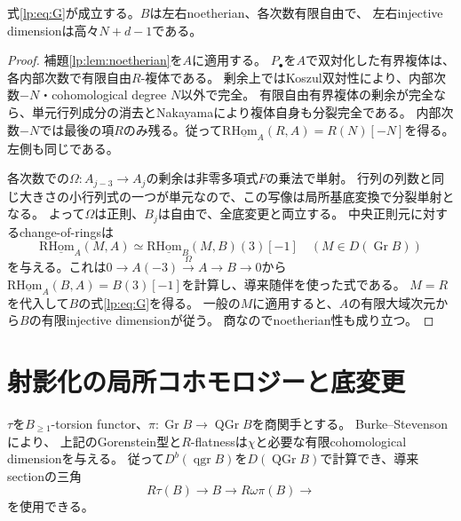 \begin{proposition}[相対Gorenstein型と中心商]\label{lp:prop:gorenstein}
式\eqref{lp:eq:G}が成立する。$B$は左右noetherian、各次数有限自由で、
左右injective dimensionは高々$N+d-1$である。
\end{proposition}
\begin{proof}
補題\ref{lp:lem:noetherian}を$A$に適用する。
$P_\bullet$を$A$で双対化した有界複体は、各内部次数で有限自由$R$-複体である。
剰余上ではKoszul双対性により、内部次数$-N$・cohomological degree $N$以外で完全。
有限自由有界複体の剰余が完全なら、単元行列成分の消去とNakayamaにより複体自身も分裂完全である。
内部次数$-N$では最後の項$R$のみ残る。従って$\operatorname{R\underline{Hom}}_A(R,A)=R(N)[-N]$を得る。
左側も同じである。

各次数での$\Omega:A_{j-3}\to A_j$の剰余は非零多項式$F$の乗法で単射。
行列の列数と同じ大きさの小行列式の一つが単元なので、この写像は局所基底変換で分裂単射となる。
よって$\Omega$は正則、$B_j$は自由で、全底変更と両立する。
中央正則元に対するchange-of-ringsは
\[
 \operatorname{R\underline{Hom}}_A(M,A)
 \simeq\operatorname{R\underline{Hom}}_B(M,B)(3)[-1]
 \quad(M\in D(\operatorname{Gr}B))
 \tag{CR}\label{lp:eq:change-rings}
\]
を与える。これは$0\to A(-3)\xrightarrow{\Omega}A\to B\to0$から
$\operatorname{R\underline{Hom}}_A(B,A)=B(3)[-1]$を計算し、導来随伴を使った式である。
$M=R$を代入して$B$の式\eqref{lp:eq:G}を得る。
一般の$M$に適用すると、$A$の有限大域次元から$B$の有限injective dimensionが従う。
商なのでnoetherian性も成り立つ。
\end{proof}

\section{射影化の局所コホモロジーと底変更}
\label{lp:sec:cohomology}
$\tau$を$B_{\ge1}$-torsion functor、$\pi:\operatorname{Gr}B\to\operatorname{QGr}B$を商関手とする。
Burke--Stevenson\cite[Section 4, Lemmas 6.1--6.2]{LP-BS}により、
上記のGorenstein型と$R$-flatnessは$\chi$と必要な有限cohomological dimensionを与える。
従って$D^b(\operatorname{qgr}B)$を$D(\operatorname{QGr}B)$で計算でき、導来sectionの三角
\[
 R\tau(B)\longrightarrow B\longrightarrow R\omega\pi(B)\longrightarrow
 \tag{LC}\label{lp:eq:torsion}
\]
を使用できる。

